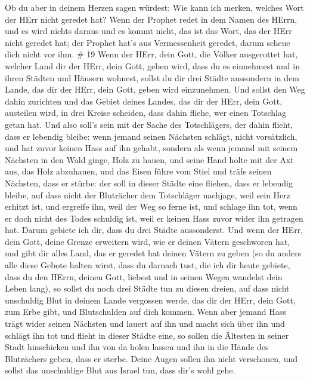  Ob du aber in deinem Herzen sagen würdest: Wie kann ich
merken, welches Wort der HErr nicht geredet hat?  Wenn der
Prophet redet in dem Namen des HErrn, und es wird nichts daraus und es
kommt nicht, das ist das Wort, das der HErr nicht geredet hat; der
Prophet hat's aus Vermessenheit geredet, darum scheue dich nicht vor
ihm. \# 19  Wenn der HErr, dein Gott, die Völker ausgerottet
hat, welcher Land dir der HErr, dein Gott, geben wird, dass du es
einnehmest und in ihren Städten und Häusern wohnest,  sollst
du dir drei Städte aussondern in dem Lande, das dir der HErr, dein Gott,
geben wird einzunehmen.  Und sollst den Weg dahin zurichten
und das Gebiet deines Landes, das dir der HErr, dein Gott, austeilen
wird, in drei Kreise scheiden, dass dahin fliehe, wer einen Totschlag
getan hat.  Und also soll's sein mit der Sache des
Totschlägers, der dahin flieht, dass er lebendig bleibe: wenn jemand
seinen Nächsten schlägt, nicht vorsätzlich, und hat zuvor keinen Hass
auf ihn gehabt,  sondern als wenn jemand mit seinem Nächsten
in den Wald ginge, Holz zu hauen, und seine Hand holte mit der Axt aus,
das Holz abzuhauen, und das Eisen führe vom Stiel und träfe seinen
Nächsten, dass er stürbe: der soll in dieser Städte eine fliehen, dass
er lebendig bleibe,  auf dass nicht der Bluträcher dem
Totschläger nachjage, weil sein Herz erhitzt ist, und ergreife ihn, weil
der Weg so ferne ist, und schlage ihn tot, wenn er doch nicht des Todes
schuldig ist, weil er keinen Hass zuvor wider ihn getragen hat.
 Darum gebiete ich dir, dass du drei Städte aussonderst.
 Und wenn der HErr, dein Gott, deine Grenze erweitern wird,
wie er deinen Vätern geschworen hat, und gibt dir alles Land, das er
geredet hat deinen Vätern zu geben  (so du anders alle diese
Gebote halten wirst, dass du darnach tust, die ich dir heute gebiete,
dass du den HErrn, deinen Gott, liebest und in seinen Wegen wandelst
dein Leben lang), so sollst du noch drei Städte tun zu diesen dreien,
 auf dass nicht unschuldig Blut in deinem Lande vergossen
werde, das dir der HErr, dein Gott, zum Erbe gibt, und Blutschulden auf
dich kommen.  Wenn aber jemand Hass trägt wider seinen
Nächsten und lauert auf ihn und macht sich über ihn und schlägt ihn tot
und flieht in dieser Städte eine,  so sollen die Ältesten
in seiner Stadt hinschicken und ihn von da holen lassen und ihn in die
Hände des Bluträchers geben, dass er sterbe.  Deine Augen
sollen ihn nicht verschonen, und sollst das unschuldige Blut aus Israel
tun, dass dir's wohl gehe.

